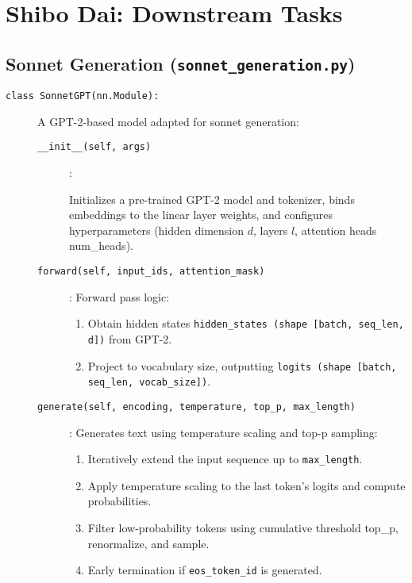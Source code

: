 \section{Shibo Dai: Downstream Tasks}
\subsection{Sonnet Generation (\texttt{sonnet\_generation.py})}

\begin{description}
\item[\texttt{class SonnetGPT(nn.Module):}]

A GPT-2-based model adapted for sonnet generation:

\begin{description}
\item[\texttt{\_\_init\_\_(self, args)}]:

Initializes a pre-trained GPT-2 model and tokenizer, binds embeddings to the linear layer weights, and configures hyperparameters (hidden dimension $d$, layers $l$, attention heads num\_heads).
\item[\texttt{forward(self, input\_ids, attention\_mask)}]:
Forward pass logic:
\begin{enumerate}
\item Obtain hidden states \texttt{hidden\_states (shape [batch, seq\_len, d])} from GPT-2.
\item Project to vocabulary size, outputting \texttt{logits (shape [batch, seq\_len, vocab\_size])}.
\end{enumerate}
\item[\texttt{generate(self, encoding, temperature, top\_p, max\_length)}]:
Generates text using temperature scaling and top-p sampling:
\begin{enumerate}
\item Iteratively extend the input sequence up to \texttt{max\_length}.
\item Apply temperature scaling to the last token's logits and compute probabilities.
\item Filter low-probability tokens using cumulative threshold top\_p, renormalize, and sample.
\item Early termination if \texttt{eos\_token\_id} is generated.
\end{enumerate}
\end{description}


\end{description}
